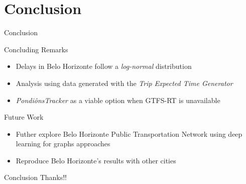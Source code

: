 \documentclass[xcolor=dvipsnames,table]{beamer}
\begin{document}
\section{Conclusion}
\begin{frame}{Conclusion}
        \begin{block}{Concluding Remarks}
                \begin{itemize}
                        \item Delays in Belo Horizonte follow a {\em log-normal} distribution
                        \item Analysis using data generated with the \textit{Trip Expected Time Generator}
                        \item \textit{PondiônsTracker} as a viable option when GTFS-RT is unavailable
                \end{itemize}
        \end{block}
        \begin{block}{Future Work}
                \begin{itemize}
                        \item Futher explore Belo Horizonte Public Transportation Network using deep learning for graphs approaches 
                        \item Reproduce Belo Horizonte's results with other cities
                \end{itemize}
        \end{block}
\end{frame}



\begin{frame}{Conclusion}
        Thanks!!
\end{frame}
\end{document}
